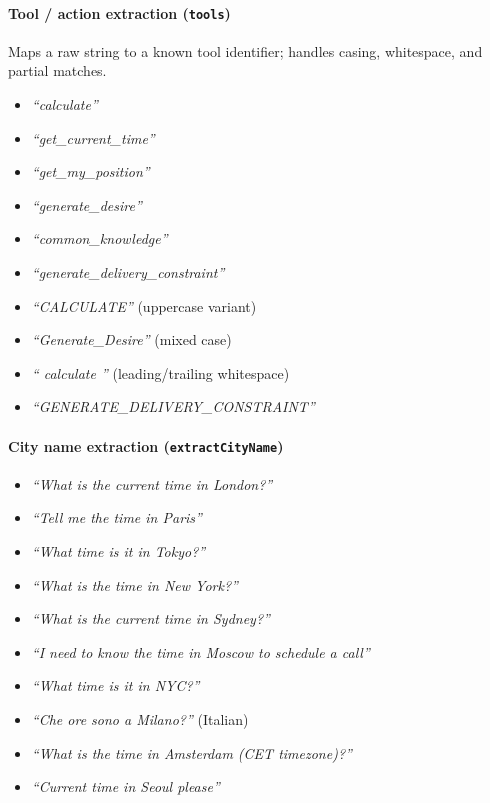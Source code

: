 \paragraph{Tool / action extraction (\texttt{tools})}
Maps a raw string to a known tool identifier; handles casing, whitespace, and partial matches.
\begin{itemize}
  \item \textit{``calculate''}
  \item \textit{``get\_current\_time''}
  \item \textit{``get\_my\_position''}
  \item \textit{``generate\_desire''}
  \item \textit{``common\_knowledge''}
  \item \textit{``generate\_delivery\_constraint''}
  \item \textit{``CALCULATE''} \quad (uppercase variant)
  \item \textit{``Generate\_Desire''} \quad (mixed case)
  \item \textit{``  calculate  ''} \quad (leading/trailing whitespace)
  \item \textit{``GENERATE\_DELIVERY\_CONSTRAINT''}
\end{itemize}

\paragraph{City name extraction (\texttt{extractCityName})}
\begin{itemize}
  \item \textit{``What is the current time in London?''}
  \item \textit{``Tell me the time in Paris''}
  \item \textit{``What time is it in Tokyo?''}
  \item \textit{``What is the time in New York?''}
  \item \textit{``What is the current time in Sydney?''}
  \item \textit{``I need to know the time in Moscow to schedule a call''}
  \item \textit{``What time is it in NYC?''}
  \item \textit{``Che ore sono a Milano?''} \quad (Italian)
  \item \textit{``What is the time in Amsterdam (CET timezone)?''}
  \item \textit{``Current time in Seoul please''}
\end{itemize}

